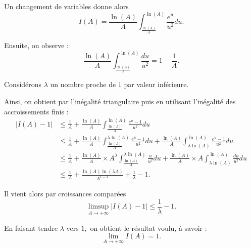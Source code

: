 Un changement de variables donne alors $$I(A)=\frac{\ln(A)}{A}\int_{\frac{\ln(A)}{A}}^{\ln(A)}\frac{e^{u}}{u^{2}}du.$$

Ensuite, on observe : $$\frac{\ln(A)}{A}\int_{\frac{\ln(A)}{A}}^{\ln(A)}\frac{du}{u^{2}}=1-\frac{1}{A}.$$

Considérons $\lambda$ un nombre proche de $1$ par valeur inférieure.

Ainsi, on obtient par l'inégalité triangulaire puis en utilisant l'inégalité des accroissements finis :
\begin{align*}
\vert I(A)-1 \vert  & \leq \frac{1}{A}+\frac{\ln(A)}{A}\int_{\frac{\ln(A)}{A}}^{\ln(A)}\frac{e^{u}-1}{u^{2}}du\\
& \leq \frac{1}{A}+\frac{\ln(A)}{A}\int_{\frac{\ln(A)}{A}}^{\lambda \ln(A)}\frac{e^{u}-1}{u^{2}}du+ \frac{\ln(A)}{A}\int_{\lambda \ln(A)}^{\ln(A)}\frac{e^{u}-1}{u^{2}}du\\
& \leq \frac{1}{A}+\frac{\ln(A)}{A}\times A^{\lambda}\int_{\frac{\ln(A)}{A}}^{\lambda \ln(A)}\frac{u}{u^{2}}du+ \frac{\ln(A)}{A}\times A \int_{\lambda \ln(A)}^{\ln(A)}\frac{du}{u^{2}}du\\
& \leq \frac{1}{A}+\frac{\ln(A)\ln(\lambda A)}{A^{1-\lambda}}+\frac{1}{\lambda}-1.
\end{align*}

Il vient alors par croissances comparées 
$$\limsup_{A\rightarrow +\infty} \vert I(A)-1\vert \leq \frac{1}{\lambda}-1.$$

En faisant tendre $\lambda$ vers $1,$ on obtient le résultat voulu, à savoir : $$\lim_{A\rightarrow +\infty} I(A)=1.$$